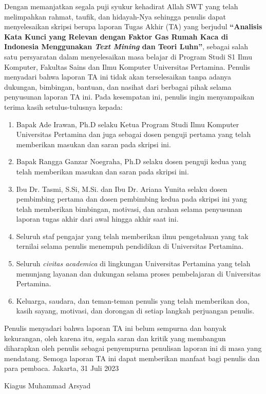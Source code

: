 Dengan memanjatkan segala puji syukur kehadirat Allah SWT yang telah melimpahkan rahmat, taufik, dan hidayah-Nya sehingga penulis dapat menyelesaikan skripsi berupa laporan Tugas Akhir (TA) yang berjudul \textbf{“Analisis Kata Kunci yang Relevan dengan Faktor Gas Rumah Kaca di Indonesia Menggunakan \textit{Text Mining} dan Teori Luhn”}, sebagai salah satu persyaratan dalam menyelesaikan masa belajar di Program Studi S1 Ilmu Komputer, Fakultas Sains dan Ilmu Komputer Universitas Pertamina.
Penulis menyadari bahwa laporan TA ini tidak akan terselesaikan tanpa adanya dukungan, bimbingan, bantuan, dan nasihat dari berbagai pihak selama penyusunan laporan TA ini. Pada kesempatan ini, penulis ingin menyampaikan terima kasih setulus-tulusnya kepada:
\begin{enumerate}
    \item Bapak Ade Irawan, Ph.D selaku Ketua Program Studi Ilmu Komputer Universitas Pertamina dan juga sebagai dosen penguji pertama yang telah memberikan masukan dan saran pada skripsi ini.
    \item Bapak Rangga Ganzar Noegraha, Ph.D selaku dosen penguji kedua yang telah memberikan masukan dan saran pada skripsi ini.
    \item Ibu Dr. Tasmi, S.Si, M.Si. dan Ibu Dr. Ariana Yunita selaku dosen pembimbing pertama dan dosen pembimbing kedua pada skripsi ini yang telah memberikan bimbingan, motivasi, dan arahan selama penyusunan laporan tugas akhir dari awal hingga akhir saat ini.
    \item Seluruh staf pengajar yang telah memberikan ilmu pengetahuan yang tak ternilai selama penulis menempuh pendidikan di Universitas Pertamina.
    \item Seluruh \textit{civitas academica} di lingkungan Universitas Pertamina yang telah menunjang layanan dan dukungan selama proses pembelajaran di Universitas Pertamina.
    \item Keluarga, saudara, dan teman-teman penulis yang telah memberikan doa, kasih sayang, motivasi, dan dorongan di setiap langkah perjuangan penulis.
\end{enumerate}

Penulis menyadari bahwa laporan TA ini belum sempurna dan banyak kekurangan, oleh karena itu, segala saran dan kritik yang membangun diharapkan oleh penulis sebagai penyempurna penulisan laporan ini di masa yang mendatang. Semoga laporan TA ini dapat memberikan manfaat bagi penulis dan para pembaca.
	\vskip 1cm
	\hspace{10cm} Jakarta, 31 Juli 2023 \par
	\vskip 1.75cm
	\hspace{10cm} Kiagus Muhammad Arsyad

